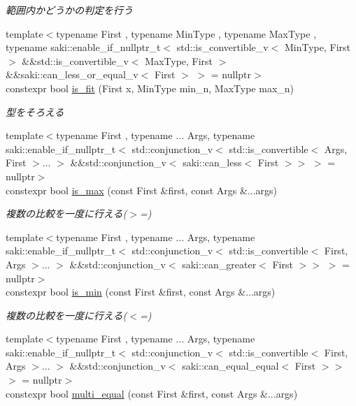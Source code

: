 \begin{DoxyCompactItemize}
\begin{DoxyCompactList}\small\item\em 範囲内かどうかの判定を行う \end{DoxyCompactList}\item 
{\footnotesize template$<$typename First , typename Min\+Type , typename Max\+Type , typename saki\+::enable\+\_\+if\+\_\+nullptr\+\_\+t$<$ std\+::is\+\_\+convertible\+\_\+v$<$ Min\+Type, First $>$ \&\&std\+::is\+\_\+convertible\+\_\+v$<$ Max\+Type, First $>$ \&\&saki\+::can\+\_\+less\+\_\+or\+\_\+equal\+\_\+v$<$ First $>$ $>$  = nullptr$>$ }\\constexpr bool \mbox{\hyperlink{namespacesaki_a09478d8cb01d75e93d34f884d7133dc9}{is\+\_\+fit}} (First x, Min\+Type min\+\_\+n, Max\+Type max\+\_\+n)
\begin{DoxyCompactList}\small\item\em 型をそろえる \end{DoxyCompactList}\item 
{\footnotesize template$<$typename First , typename ... Args, typename saki\+::enable\+\_\+if\+\_\+nullptr\+\_\+t$<$ std\+::conjunction\+\_\+v$<$ std\+::is\+\_\+convertible$<$ Args, First $>$... $>$ \&\&std\+::conjunction\+\_\+v$<$ saki\+::can\+\_\+less$<$ First $>$$>$ $>$  = nullptr$>$ }\\constexpr bool \mbox{\hyperlink{namespacesaki_a48b234a435a0e21df1507c4786b975b8}{is\+\_\+max}} (const First \&first, const Args \&...args)
\begin{DoxyCompactList}\small\item\em 複数の比較を一度に行える($>$=) \end{DoxyCompactList}\item 
{\footnotesize template$<$typename First , typename ... Args, typename saki\+::enable\+\_\+if\+\_\+nullptr\+\_\+t$<$ std\+::conjunction\+\_\+v$<$ std\+::is\+\_\+convertible$<$ First, Args $>$... $>$ \&\&std\+::conjunction\+\_\+v$<$ saki\+::can\+\_\+greater$<$ First $>$$>$ $>$  = nullptr$>$ }\\constexpr bool \mbox{\hyperlink{namespacesaki_a7780d542366428c85bfc48fdf43f54ee}{is\+\_\+min}} (const First \&first, const Args \&...args)
\begin{DoxyCompactList}\small\item\em 複数の比較を一度に行える($<$=) \end{DoxyCompactList}\item 
{\footnotesize template$<$typename First , typename ... Args, typename saki\+::enable\+\_\+if\+\_\+nullptr\+\_\+t$<$ std\+::conjunction\+\_\+v$<$ std\+::is\+\_\+convertible$<$ First, Args $>$... $>$ \&\&std\+::conjunction\+\_\+v$<$ saki\+::can\+\_\+equal\+\_\+equal$<$ First $>$$>$ $>$  = nullptr$>$ }\\constexpr bool \mbox{\hyperlink{namespacesaki_aa15664a63445d3539b40b774e556a45b}{multi\+\_\+equal}} (const First \&first, const Args \&...args)

\end{DoxyCompactItemize}
